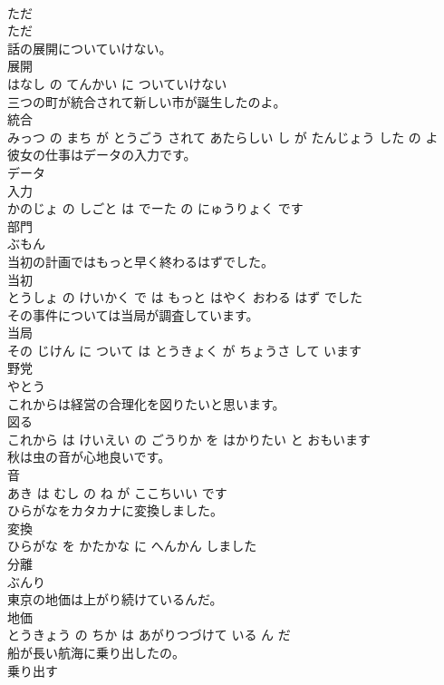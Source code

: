\documentclass[8pt]{extreport}
\begin{document}
\begin{CJK}{UTF8}{min}
\\	ただ	
\\	ただ			
\\	話の展開についていけない。	
\\	展開 
\\	はなし の てんかい に ついていけない			
\\	三つの町が統合されて新しい市が誕生したのよ。	
\\	統合 
\\	みっつ の まち が とうごう されて あたらしい し が たんじょう した の よ			
\\	彼女の仕事はデータの入力です。	
\\	データ 
\\	入力 
\\	かのじょ の しごと は でーた の にゅうりょく です			
\\	部門	
\\	ぶもん			
\\	当初の計画ではもっと早く終わるはずでした。	
\\	当初 
\\	とうしょ の けいかく で は もっと はやく おわる はず でした			
\\	その事件については当局が調査しています。	
\\	当局 
\\	その じけん に ついて は とうきょく が ちょうさ して います			
\\	野党	
\\	やとう			
\\	これからは経営の合理化を図りたいと思います。	
\\	図る 
\\	これから は けいえい の ごうりか を はかりたい と おもいます			
\\	秋は虫の音が心地良いです。	
\\	音 
\\	あき は むし の ね が ここちいい です			
\\	ひらがなをカタカナに変換しました。	
\\	変換 
\\	ひらがな を かたかな に へんかん しました			
\\	分離	
\\	ぶんり			
\\	東京の地価は上がり続けているんだ。	
\\	地価 
\\	とうきょう の ちか は あがりつづけて いる ん だ			
\\	船が長い航海に乗り出したの。	
\\	乗り出す 

\end{CJK}
\end{document}
